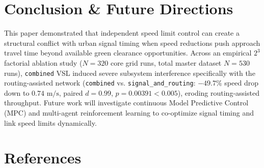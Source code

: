 \documentclass[3p,times,procedia]{elsarticle}
\begin{document}
\section{Conclusion \& Future Directions}
\label{sec:conclusion}

This paper demonstrated that independent speed limit control can create a structural conflict with urban signal timing when speed reductions push approach travel time beyond available green clearance opportunities. Across an empirical $2^3$ factorial ablation study ($N=320$ core grid runs, total master dataset $N=530$ runs), \texttt{combined} VSL induced severe subsystem interference specifically with the routing-assisted network (\texttt{combined} vs. \texttt{signal\_and\_routing}: $-49.7\%$ speed drop down to $0.74\text{ m/s}$, paired $d = 0.99$, $p = 0.00391 < 0.005$), eroding routing-assisted throughput. Future work will investigate continuous Model Predictive Control (MPC) and multi-agent reinforcement learning to co-optimize signal timing and link speed limits dynamically.


\section*{References}
\end{document}
